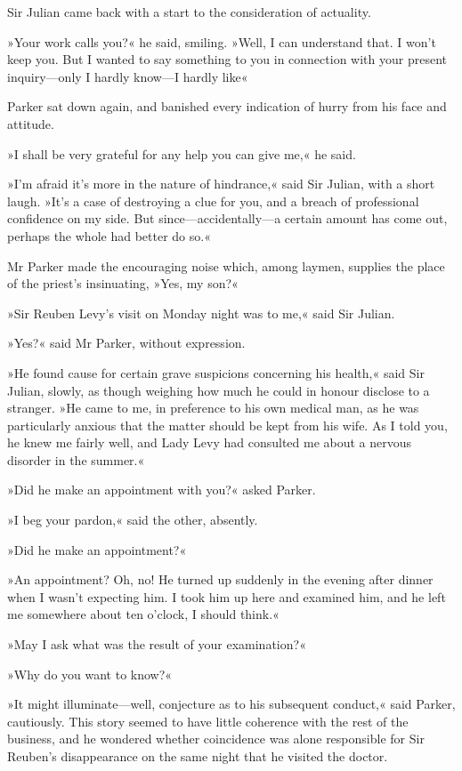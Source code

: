 Sir Julian came back with a start to the consideration of actuality.

»Your work calls you?« he said, smiling. »Well, I can understand that. I won't keep you. But I wanted to say something to you in connection with your present inquiry—only I hardly know—I hardly like\longdash«

Parker sat down again, and banished every indication of hurry from his face and attitude.

»I shall be very grateful for any help you can give me,« he said.

»I'm afraid it's more in the nature of hindrance,« said Sir Julian, with a short laugh. »It's a case of destroying a clue for you, and a breach of professional confidence on my side. But since—accidentally—a certain amount has come out, perhaps the whole had better do so.«

Mr Parker made the encouraging noise which, among laymen, supplies the place of the priest's insinuating, »Yes, my son?«

»Sir Reuben Levy's visit on Monday night was to me,« said Sir Julian.

»Yes?« said Mr Parker, without expression.

»He found cause for certain grave suspicions concerning his health,« said Sir Julian, slowly, as though weighing how much he could in honour disclose to a stranger. »He came to me, in preference to his own medical man, as he was particularly anxious that the matter should be kept from his wife. As I told you, he knew me fairly well, and Lady Levy had consulted me about a nervous disorder in the summer.«

»Did he make an appointment with you?« asked Parker.

»I beg your pardon,« said the other, absently.

»Did he make an appointment?«

»An appointment? Oh, no! He turned up suddenly in the evening after dinner when I wasn't expecting him. I took him up here and examined him, and he left me somewhere about ten o'clock, I should think.«

»May I ask what was the result of your examination?«

»Why do you want to know?«

»It might illuminate—well, conjecture as to his subsequent conduct,« said Parker, cautiously. This story seemed to have little coherence with the rest of the business, and he wondered whether coincidence was alone responsible for Sir Reuben's disappearance on the same night that he visited the doctor.

